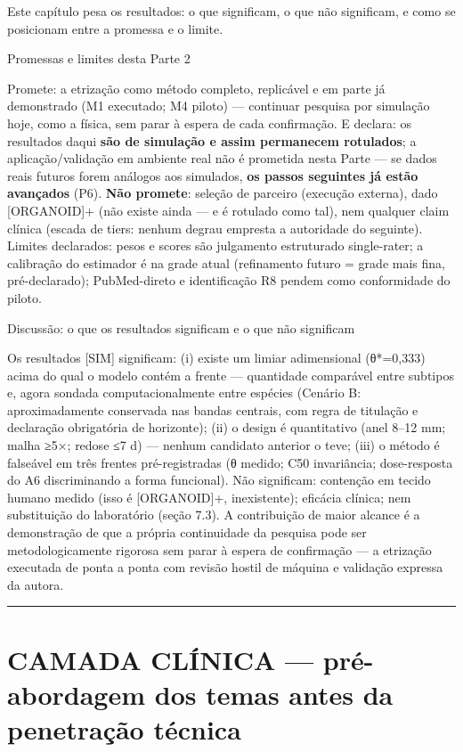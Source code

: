 \documentclass[12pt,a4paper,oneside]{report}
\begin{document}
Este capítulo pesa os resultados: o que significam, o que não
significam, e como se posicionam entre a promessa e o limite.

Promessas e limites desta Parte 2

Promete: a etrização como método completo, replicável e em parte já
demonstrado (M1 executado; M4 piloto) --- continuar pesquisa por
simulação hoje, como a física, sem parar à espera de cada confirmação. E
declara: os resultados daqui \textbf{são de simulação e assim permanecem
rotulados}; a aplicação/validação em ambiente real não é prometida nesta
Parte --- se dados reais futuros forem análogos aos simulados,
\textbf{os passos seguintes já estão avançados} (P6). \textbf{Não
promete}: seleção de parceiro (execução externa), dado {[}ORGANOID{]}+
(não existe ainda --- e é rotulado como tal), nem qualquer claim clínica
(escada de tiers: nenhum degrau empresta a autoridade do seguinte).
Limites declarados: pesos e scores são julgamento estruturado
single-rater; a calibração do estimador é na grade atual (refinamento
futuro = grade mais fina, pré-declarado); PubMed-direto e identificação
R8 pendem como conformidade do piloto.

Discussão: o que os resultados significam e o que não significam

Os resultados {[}SIM{]} significam: (i) existe um limiar adimensional
(θ*=0,333) acima do qual o modelo contém a frente --- quantidade
comparável entre subtipos e, agora sondada computacionalmente entre
espécies (Cenário B: aproximadamente conservada nas bandas centrais, com
regra de titulação e declaração obrigatória de horizonte); (ii) o design
é quantitativo (anel 8--12 mm; malha ≥5×; redose ≤7 d) --- nenhum
candidato anterior o teve; (iii) o método é falseável em três frentes
pré-registradas (θ medido; C50 invariância; dose-resposta do A6
discriminando a forma funcional). Não significam: contenção em tecido
humano medido (isso é {[}ORGANOID{]}+, inexistente); eficácia clínica;
nem substituição do laboratório (seção 7.3). A contribuição de maior
alcance é a demonstração de que a própria continuidade da pesquisa pode
ser metodologicamente rigorosa sem parar à espera de confirmação --- a
etrização executada de ponta a ponta com revisão hostil de máquina e
validação expressa da autora.

\begin{center}\rule{0.5\linewidth}{0.5pt}\end{center}

\hypertarget{camada-cluxednica-pruxe9-abordagem-dos-temas-antes-da-penetrauxe7uxe3o-tuxe9cnica}{%
\chapter{CAMADA CLÍNICA --- pré-abordagem dos temas antes da penetração
técnica}\label{camada-cluxednica-pruxe9-abordagem-dos-temas-antes-da-penetrauxe7uxe3o-tuxe9cnica}}
\end{document}
